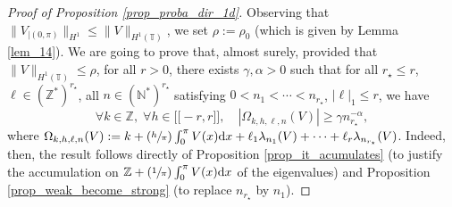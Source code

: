 \documentclass[11pt]{article}
\newcommand{\Psfrac}[2]{(\sfrac{#1}{#2})}
\newcommand{\llbracket}{\mathopen{[\!\![}}
\newcommand{\rrbracket}{\mathclose{]\!\!]}}
\theoremstyle{definition}
\begin{document}
\begin{proof}[Proof of Proposition \ref{prop_proba_dir_1d}] Observing that $\| V_{|(0,\pi)}\|_{H^1} \leq \| V\|_{H^1(\mathbb{T})}$, we set $\rho:= \rho_0$ (which is given by Lemma \ref{lem_14}). We are going to prove that, almost surely, provided that $\| V\|_{H^1(\mathbb{T})} \leq \rho$, for all $r>0$, there exists $\gamma,\alpha>0$ such that for all $r_\star \leq r$, $\ell \in (\mathbb{Z}^*)^{r_\star}$, all $n \in (\mathbb{N}^*)^{r_\star}$ satisfying $0<n_1<\cdots<n_{r_\star}$, $|\ell|_1 \leq r$, we have
\begin{equation}
\label{eq_weak_NLS}
\forall k \in \mathbb{Z},\;\forall h\in \llbracket -r,r \rrbracket, \quad | \Omega_{k,h,\ell,n}(V) | \geq \gamma n_{r_\star}^{-\alpha},
\end{equation}
where
$\Omega_{k,h,\ell,n}(V):= k+\Psfrac{h}\pi \int_0^\pi V(x) \mathrm{d}x + \ell_1 \lambda_{n_1}(V)+\cdots+\ell_r \lambda_{n_{r_\star}}(V)$.
Indeed, then, the result follows directly of Proposition \ref{prop_it_acumulates} (to justify the accumulation on $\mathbb{Z}+ \Psfrac1\pi \int_0^\pi V(x) \mathrm{d}x$ of the eigenvalues) and Proposition \ref{prop_weak_become_strong} (to replace $n_{r_\star}$ by $n_{1}$).


\end{proof}
\end{document}
